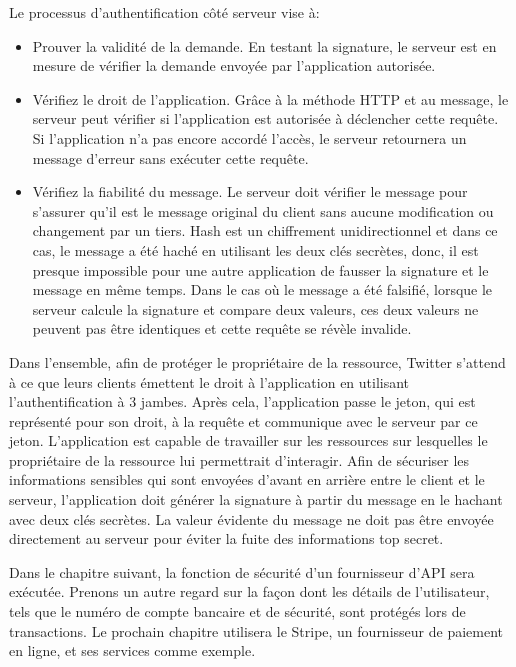 Le processus d'authentification côté serveur vise à:
\begin{itemize}
\item Prouver la validité de la demande. En testant la signature, le serveur est en mesure de vérifier la demande envoyée par l'application autorisée.
\item Vérifiez le droit de l'application. Grâce à la méthode HTTP et au message, le serveur peut vérifier si l'application est autorisée à déclencher cette requête. Si l'application n'a pas encore accordé l'accès, le serveur retournera un message d'erreur sans exécuter cette requête.
\item Vérifiez la fiabilité du message. Le serveur doit vérifier le message pour s'assurer qu'il est le message original du client sans aucune modification ou changement par un tiers. Hash est un chiffrement unidirectionnel et dans ce cas, le message a été haché en utilisant les deux clés secrètes, donc, il est presque impossible pour une autre application de fausser la signature et le message en même temps. Dans le cas où le message a été falsifié, lorsque le serveur calcule la signature et compare deux valeurs, ces deux valeurs ne peuvent pas être identiques et cette requête se révèle invalide.
\end{itemize}
Dans l'ensemble, afin de protéger le propriétaire de la ressource, Twitter s'attend à ce que leurs clients émettent le droit à l'application en utilisant l'authentification à 3 jambes. Après cela, l'application passe le jeton, qui est représenté pour son droit, à la requête et communique avec le serveur par ce jeton. L'application est capable de travailler sur les ressources sur lesquelles le propriétaire de la ressource lui permettrait d'interagir. Afin de sécuriser les informations sensibles qui sont envoyées d'avant en arrière entre le client et le serveur, l'application doit générer la signature à partir du message en le hachant avec deux clés secrètes. La valeur évidente du message ne doit pas être envoyée directement au serveur pour éviter la fuite des informations top secret.

Dans le chapitre suivant, la fonction de sécurité d'un fournisseur d'API sera exécutée. Prenons un autre regard sur la façon dont les détails de l'utilisateur, tels que le numéro de compte bancaire et de sécurité, sont protégés lors de transactions. Le prochain chapitre utilisera le Stripe, un fournisseur de paiement en ligne, et ses services comme exemple.


		
		
















		
